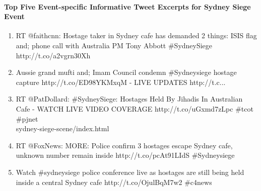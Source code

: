 \paragraph{Top Five Event-specific Informative Tweet Excerpts for Sydney Siege Event}
\begin{enumerate}
\item RT @faithcnn: Hostage taker in Sydney cafe has demanded 2 things: ISIS flag and; phone call with Australia PM Tony Abbott \#SydneySiege http://t.co/a2vgrn30Xh
\item Aussie grand mufti and; Imam Council condemn \#Sydneysiege hostage capture http://t.co/ED98YKMxqM - LIVE UPDATES http://t.c...
\item RT @PatDollard: \#SydneySiege: Hostages Held By Jihadis In Australian Cafe - WATCH LIVE VIDEO COVERAGE http://t.co/uGxmd7zLpc \#tcot \#pjnet \\ sydney-siege-scene/index.html
\item RT @FoxNews: MORE: Police confirm 3 hostages escape Sydney cafe, unknown number remain inside http://t.co/pcAt91LIdS \#Sydneysiege
\item Watch \#sydneysiege police conference live as hostages are still being held inside a central Sydney cafe http://t.co/OjulBqM7w2 \#c4news
\end{enumerate}


